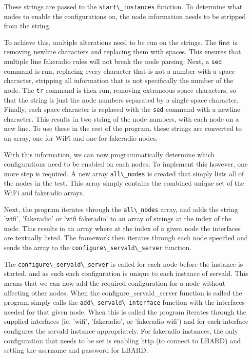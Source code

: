 These strings are passed to the \verb|start\_instances| function. 
To determine what nodes to enable the configurations on, the node information needs to be stripped from the string.

To achieve this, multiple alterations need to be run on the strings.
The first is removing newline characters and replacing them with spaces.
This ensures that multiple line fakeradio rules will not break the node parsing.
Next, a \verb|sed| command is run, replacing every character that is not a number with a space character, stripping all information that is not specifically the number of the node.
The \verb|tr| command is then run, removing extraneous space characters, so that the string is just the node numbers separated by a single space character.
Finally, each space character is replaced with the \verb|sed| command with a newline character.
This results in two string of the node numbers, with each node on a new line.
To use these in the rest of the program, these strings are converted to an array, one for WiFi and one for fakeradio nodes.

With this information, we can now programmatically determine which configurations need to be enabled on each nodes.
To implement this however, one more step is required.
A new array \verb|all\_nodes| is created that simply lists all of the nodes in the test.
This array simply contains the combined unique set of the WiFi and fakeradio arrays.

Next, the program iterates through the \verb|all\_nodes| array, and adds the string 'wifi', 'fakeradio' or 'wifi fakeradio' to an array of strings at the index of the node.
This results in an array where at the index of a given node the interfaces are textually listed.
The framework then iterates through each node specified and sends the array to the \verb|configure\_servald\_server| function.


The \verb|configure\_servald\_server| is called for each node before the instance is started, and as such each configuration is unique to each instance of servald.
This means that we can now add the required configuration for a node without affecting other nodes.
When the configure\_servald\_server function is called the program simply calls the \verb|add\_servald\_interface| function with the interfaces needed for that given node.
When this is called the program iterates through the supplied interfaces (ie. 'wifi', 'fakeradio', or 'fakeradio wifi') and for each interface configures the servald instance appropriately.
For fakeradio instances, the only configuration that needs to be set is enabling http (to connect to LBARD) and setting the username and password for LBARD.

